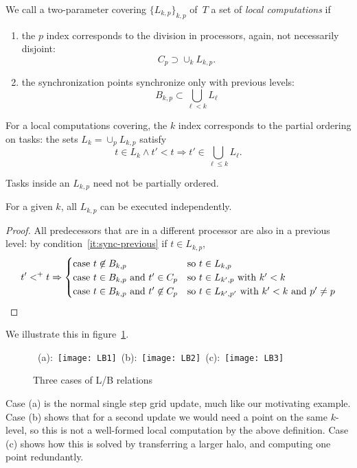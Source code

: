 \begin{definition}
  \label{def:localcomp}
  We call a two-parameter covering $\{L_{k,p}\}_{k,p}$ of~$T$ 
  a set of \emph{local computations} if
  \begin{enumerate}
  \item the $p$ index corresponds to the division in processors,
    again, not necessarily disjoint:
    \[ C_p \supset \cup_k L_{k,p}.  \]
  \item\label{it:sync-previous} the synchronization points synchronize
    only with previous levels:
    \begin{equation}
      B_{k,p}\subset \bigcup_{\ell<k} L_{\ell}
      \label{eq:Lpred}
    \end{equation}
  \end{enumerate}
\end{definition}

\begin{lemma}
  For a local computations covering, the $k$ index corresponds to the
  partial ordering on tasks: the sets $L_k=\cup_p L_{k,p}$ satisfy
  \[ t\in L_k \wedge t'<t \Rightarrow t'\in \bigcup_{\ell\leq k} L_\ell. \]
\end{lemma}

Tasks inside an $L_{k,p}$ need not be partially ordered.

\begin{theorem}
  For a given $k$, all $L_{k,p}$ can be executed independently.
\end{theorem}
\begin{proof}
  All predecessors that are in a different processor are also
  in a previous level: by condition~\ref{it:sync-previous}
  if $t\in L_{k,p}$,
  \[ t'<^+ t\Rightarrow
  \begin{cases}
    \hbox{case $t\not\in B_{k,p}$}&\hbox{so $t\in L_{k,p}$}\\
    \hbox{case $t\in B_{k,p}$ and $t'\in C_p$}
    &\hbox{so $t\in L_{k',p}$ with $k'<k$}\\
    \hbox{case $t\in B_{k,p}$ and $t'\not\in C_p$}
    &\hbox{so $t\in L_{k',p'}$ with $k'<k$ and $p'\not=p$}\\
  \end{cases}
  \]
\end{proof}

We illustrate this in figure~\ref{fig:LBs}.
\begin{figure}
  \hbox{%
    (a): \texttt{[image: LB1]}
    (b): \texttt{[image: LB2]}
    (c): \texttt{[image: LB3]}
  }
  \caption{Three cases of L/B relations}
  \label{fig:LBs}
\end{figure}
Case (a) is the normal single step grid update, much like our 
motivating example.
Case (b) shows that for a second update we would need a point
on the same $k$-level, so this is not a well-formed local computation
by the above definition.
Case (c) shows how this is solved by transferring a larger halo,
and computing one point redundantly.


